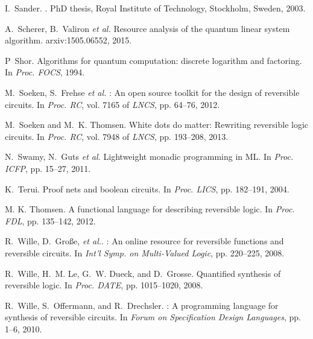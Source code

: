 \documentclass{article}
\theoremstyle{plain}
\theoremstyle{definition}
\begin{document}
\begin{thebibliography}{10}
I.~Sander.
.
\newblock PhD thesis, Royal Institute of Technology, Stockholm, Sweden, 2003.

A.~Scherer, B.~Valiron {\em et al.}
\newblock Resource analysis of the quantum linear system algorithm.
\newblock arxiv:1505.06552, 2015.

P~Shor.
\newblock Algorithms for quantum computation: discrete logarithm and
  factoring.
\newblock In {\em Proc. FOCS}, 1994.

M.~Soeken, S.~Frehse {\em et al.}
: An open source toolkit for the design of reversible
  circuits.
\newblock In {\em Proc. RC}, vol. 7165 of {\em LNCS},
  pp. 64--76, 2012.

M.~Soeken and M.~K. Thomsen.
\newblock White dots do matter: Rewriting reversible logic circuits.
\newblock In {\em Proc. RC}, vol. 7948 of {\em LNCS}, pp.
  193--208, 2013.

N.~Swamy, N.~Guts {\em et al.}
\newblock Lightweight monadic programming in {ML}.
\newblock In {\em Proc. ICFP}, pp. 15--27,  2011.

K.~Terui.
\newblock Proof nets and boolean circuits.
\newblock In {\em Proc. LICS}, pp. 182--191, 2004.

M. K. Thomsen.
\newblock A functional language for describing reversible logic.
\newblock In {\em Proc. FDL}, pp. 135--142, 2012.

R.~Wille, D.~Gro{\ss}e, {\em et al.}.
: An online resource for reversible functions and reversible
  circuits.
\newblock In {\em {Int'l Symp. on Multi-Valued Logic}}, pp. 220--225, 2008.

R.~Wille, H.~M. Le, G.~W. Dueck, and D.~Grosse.
\newblock Quantified synthesis of reversible logic.
\newblock In {\em Proc. DATE}, pp. 1015--1020, 2008.

R.~Wille, S.~Offermann, and R.~Drechsler.
: A programming language for synthesis of reversible circuits.
\newblock In {\em Forum on Specification Design Languages}, pp. 1--6, 2010.

\end{thebibliography}
\end{document}
